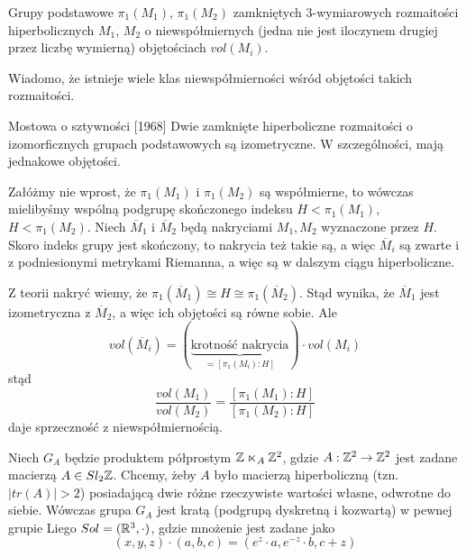 \begin{example}[m]
\item Grupy podstawowe $\pi_1(M_1)$, $\pi_1(M_2)$ zamkniętych $3$-wymiarowych rozmaitości hiperbolicznych $M_1$, $M_2$ o niewspółmiernych (jedna nie jest iloczynem drugiej przez liczbę wymierną) objętościach $vol(M_i)$.

  Wiadomo, że istnieje wiele klas niewspółmierności wśród objętości takich rozmaitości.

  \begin{theorem}{Mostowa o sztywności [1968]}{}
    Dwie zamknięte hiperboliczne rozmaitości o izomorficznych grupach podstawowych są izometryczne. W szczególności, mają jednakowe objętości.
  \end{theorem}

  Załóżmy nie wprost, że $\pi_1(M_1)$ i $\pi_1(M_2)$ są współmierne, to wówczas mielibyśmy wspólną podgrupę skończonego indeksu $H< \pi_1(M_1)$, $H<\pi_1(M_2)$. Niech $\overline{M}_1$ i $\overline{M}_2$ będą nakryciami $M_1,M_2$ wyznaczone przez $H$. Skoro indeks grupy jest skończony, to nakrycia też takie są, a więc $\overline{M}_i$ są zwarte i z podniesionymi metrykami Riemanna, a więc są w dalszym ciągu hiperboliczne.

  Z teorii nakryć wiemy, że $\pi_1(\overline{M}_1)\cong H\cong \pi_1(\overline{M}_2)$. Stąd wynika, że $\overline{M}_1$ jest izometryczna z $\overline{M}_2$, a więc ich objętości są równe sobie. Ale 
  $$vol(\overline{M}_i)=(\underbrace{\text{krotność nakrycia}}_{=[\pi_1(M_i):H]})\cdot vol(M_i)$$
  stąd 
  $$\frac{vol(M_1)}{vol(M_2)}=\frac{[\pi_1(M_1):H]}{[\pi_1(M_2):H]}$$
  daje sprzeczność z niewspółmiernością.
\item Niech $G_A$ będzie produktem półprostym $\mathbb{Z}\ltimes_A\mathbb{Z}^2$, gdzie $A:\mathbb{Z}^2\to \mathbb{Z}^2$ jest zadane macierzą $A\in Sl_2\mathbb{Z}$. Chcemy, żeby $A$ było macierzą hiperboliczną (tzn. $|tr(A)|>2$) posiadającą dwie różne rzeczywiste wartości własne, odwrotne do siebie. Wówczas grupa $G_A$ jest kratą (podgrupą dyskretną i kozwartą) w pewnej grupie Liego $Sol=(\mathbb{R}^3,\cdot)$, gdzie mnożenie jest zadane jako
  $$(x,y,z)\cdot(a,b,c)=(e^z\cdot a,e^{-z}\cdot b,c+z)$$
\end{example}

